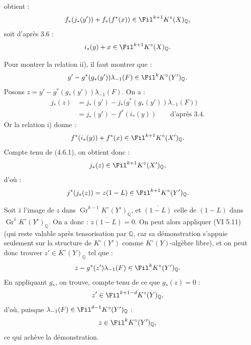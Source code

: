 obtient :
\[
  f_*(j_*(y'))+f_*(f^*(x))\in\Fil^{k+1}K^\circ(X)_{\mathbb Q},
\]
soit d'après 3.6 :
\[
  i_*(y)+x\in\Fil^{k+1}K^\circ(X)_{\mathbb Q}.
\]

Pour montrer la relation ii), il faut montrer que :
\[
  y'-g^*(g_*(y'))\lambda_{-1}(F)\in\Fil^kK^\circ(Y')_{\mathbb Q}.
\]
Posons \(z=y'-g^*(g_*(y'))\lambda_{-1}(F)\). On a :
\[
\begin{aligned}
j_*(z)
  &=j_*(y')-j_*\bigl(g^*(g_*(y'))\lambda_{-1}(F)\bigr)\\
  &=j_*(y')-f^*(i_*(y))\qquad\text{d'après 3.4.}
\end{aligned}
\]
Or la relation i) donne :
\[
  f^*(i_*(y))+f^*(x)\in\Fil^{k+1}K^\circ(X')_{\mathbb Q}.
\]
Compte tenu de (4.6.1), on obtient donc :
\[
  j_*(z)\in\Fil^{k+1}K^\circ(X')_{\mathbb Q},
\]
d'où :
\[
  j^*(j_*(z))=z(1-L)\in\Fil^{k+1}K^\circ(Y')_{\mathbb Q}.
\]

Soit \(\bar z\) l'image de \(z\) dans \(\operatorname{Gr}^{k-1}K^\circ(Y')_{\mathbb Q}\), et \(\overline{(1-L)}\) celle de \((1-L)\) dans \(\operatorname{Gr}^{1}K^\circ(Y')_{\mathbb Q}\). On a donc : \(\overline{z(1-L)}=0\). On peut alors appliquer (VI 5.11) (qui reste valable après tensorisation par \(\mathbb Q\), car sa démonstration s'appuie seulement sur la structure de \(K^\circ(Y')\) comme \(K^\circ(Y)\)-algèbre libre), et on peut donc trouver \(z'\in K^\circ(Y)_{\mathbb Q}\) tel que :
\[
  z-g^*(z')\lambda_{-1}(F)\in\Fil^kK^\circ(Y')_{\mathbb Q}.
\]
En appliquant \(g_*\), on trouve, compte tenu de ce que \(g_*(z)=0\) :
\[
  z'\in\Fil^{k+1-d}K^\circ(Y)_{\mathbb Q},
\]
d'où, puisque \(\lambda_{-1}(F)\in\Fil^{d-1}K^\circ(Y')_{\mathbb Q}\) :
\[
  z\in\Fil^kK^\circ(Y')_{\mathbb Q},
\]
ce qui achève la démonstration.

